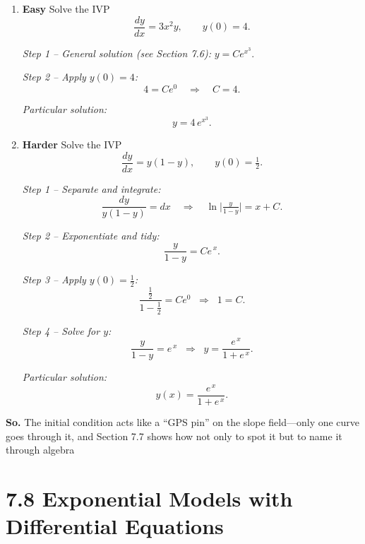\documentclass{article}
\begin{document}
\begin{enumerate}
\item \textbf{Easy}  
Solve the IVP
\[
\frac{dy}{dx}=3x^{2}y, \qquad y(0)=4.
\]

\textit{Step 1 – General solution (see Section 7.6):}\;
\(y = C e^{x^{3}}\).

\textit{Step 2 – Apply \(y(0)=4\):}
\[
4 = C e^{0}\quad\Longrightarrow\quad C = 4.
\]

\textit{Particular solution:}\;
\[
\boxed{y = 4\,e^{x^{3}}}.
\]

\bigskip
\item \textbf{Harder}  
Solve the IVP
\[
\frac{dy}{dx}=y(1-y), \qquad y(0)=\tfrac12.
\]

\textit{Step 1 – Separate and integrate:}
\[
\frac{dy}{y(1-y)} = dx
\quad\Longrightarrow\quad
\ln\!\bigl|\tfrac{y}{1-y}\bigr| = x + C.
\]

\textit{Step 2 – Exponentiate and tidy:}
\[
\frac{y}{1-y} = Ce^{\,x}.
\]

\textit{Step 3 – Apply \(y(0)=\tfrac12\):}
\[
\frac{\tfrac12}{1-\tfrac12} = C e^{0}
\;\;\Longrightarrow\;\;
1 = C.
\]

\textit{Step 4 – Solve for \(y\):}
\[
\frac{y}{1-y}=e^{\,x}
\;\;\Longrightarrow\;\;
y = \frac{e^{\,x}}{1+e^{\,x}}.
\]

\textit{Particular solution:}\;
\[
\boxed{y(x)=\dfrac{e^{\,x}}{1+e^{\,x}}}.
\]

\end{enumerate}

\noindent
\textbf{So.}  
The initial condition acts like a “GPS pin” on the slope field—only one curve goes through it, and Section 7.7 shows how not only to spot it but to name it through algebra


\newpage
\section{7.8 Exponential Models with Differential Equations}
\end{document}
